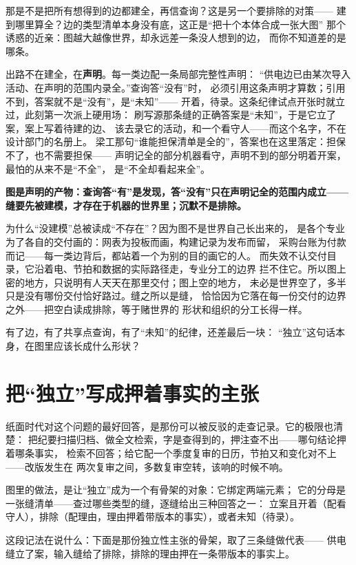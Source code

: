 那是不是把所有想得到的边都建全，再信查询？这是另一个要排除的对策——
建到哪里算全？边的类型清单本身没有底，这正是“把十个本体合成一张大图”
那个诱惑的近亲：图越大越像世界，却永远差一条没人想到的边，
而你不知道差的是哪条。

出路不在建全，在\textbf{声明}。每一类边配一条局部完整性声明：
“供电边已由某次导入活动、在声明的范围内录全。”查询答“没有”时，
必须引用这条声明才算数；引用不到，答案就不是“没有”，是“未知”——
开着，待录。这条纪律试点开张时就立过，此刻第一次派上硬用场：
刷写源那条缝的正确答案是“未知”，于是它立了案，案上写着待建的边、
该去录它的活动，和一个看守人——而这个名字，不在设计部门的名册上。
梁工那句“谁能担保清单是全的”，答案也在这里落定：担保不了，也不需要担保——
声明记全的部分机器看守，声明不到的部分明着开案，最怕的从来不是“不全”，
是“不全却看起来全”。

\textbf{图是声明的产物：查询答“有”是发现，答“没有”只在声明记全的范围内成立——缝要先被建模，才存在于机器的世界里；沉默不是排除。}

为什么“没建模”总被读成“不存在”？因为图不是世界自己长出来的，
是各个专业为了各自的交付画的：网表为投板而画，构建记录为发布而留，
采购台账为付款而记——每一类边背后，都站着一个为别的目的画它的人。
而失效不认交付目录，它沿着电、节拍和数据的实际路径走，专业分工的边界
拦不住它。所以图上密的地方，只说明有人天天在那里交付；图上空的地方，
未必是世界空了，多半只是没有哪份交付恰好路过。缝之所以是缝，
恰恰因为它落在每一份交付的边界之外——把空白读成排除，等于赌世界的
形状和组织的分工长得一样。

有了边，有了共享点查询，有了“未知”的纪律，还差最后一块：
“独立”这句话本身，在图里应该长成什么形状？

\section{把“独立”写成押着事实的主张}

纸面时代对这个问题的最好回答，是那份可以被反驳的走查记录。它的极限也清楚：
把纪要扫描归档、做全文检索，字是查得到的，押注查不出——哪句结论押着哪条事实，
检索不回答；给它配一个季度复审的日历，节拍又和变化对不上——改版发生在
两次复审之间，多数复审空转，该响的时候不响。

图里的做法，是让“独立”成为一个有骨架的对象：它绑定两端元素；
它的分母是一张缝清单——查过哪些类型的缝，逐缝给出三种回答之一：
立案且开着（配看守人），排除（配理由，理由押着带版本的事实），或者未知（待录）。

这段记法在说什么：下面是那份独立性主张的骨架，取了三条缝做代表——
供电缝立了案，输入缝给了排除，排除的理由押在一条带版本的事实上。

